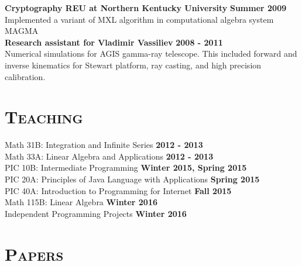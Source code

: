 \documentclass[margin, 10pt]{res} %
\begin{document}
\begin{resume}
\textbf{Cryptography REU at Northern Kentucky University} \hfill \textbf{Summer 2009}\\
Implemented a variant of MXL algorithm in computational algebra system MAGMA \\

\textbf{Research assistant for Vladimir Vassiliev} \hfill \textbf{2008 - 2011}\\
Numerical simulations for AGIS gamma-ray telescope. This included forward and inverse kinematics for Stewart platform, ray casting, and high precision calibration.

 
\section{\textsc{Teaching}}


	Math 31B: Integration and Infinite Series \hfill \textbf{2012 - 2013} \\
	Math 33A: Linear Algebra and Applications \hfill \textbf{2012 - 2013} \\
	PIC 10B: Intermediate Programming \hfill \textbf{Winter 2015,  Spring 2015} \\
	PIC 20A: Principles of Java Language with Applications \hfill \textbf{Spring 2015} \\
	PIC 40A: Introduction to Programming for Internet \hfill \textbf{Fall 2015} \\
	Math 115B: Linear Algebra \hfill \textbf{Winter 2016} \\
	Independent Programming Projects \hfill \textbf{Winter 2016}


 
\section{\textsc{Papers}}


\end{resume}
\end{document}
